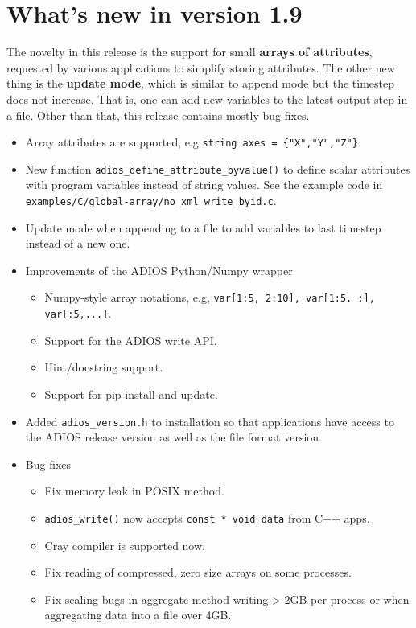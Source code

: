 \section {What's new in version 1.9}
The novelty in this release is the support for small {\bf arrays of attributes}, requested by various applications to simplify storing attributes. The other new thing is the {\bf update mode}, which is similar to append mode but the timestep does not increase. That is, one can add new variables to the latest output step in a file. Other than that, this release contains mostly bug fixes. 

\begin{itemize}
\item Array attributes are supported, e.g \verb+string axes = {"X","Y","Z"}+
\item New function \verb+adios_define_attribute_byvalue()+ 
         to define scalar attributes with program variables instead of string values. See the example code in
         \verb+examples/C/global-array/no_xml_write_byid.c+.
\item Update mode when appending to a file to add variables to last timestep instead of a new one.

\item Improvements of the ADIOS Python/Numpy wrapper
    \begin{itemize}
    \item Numpy-style array notations, e.g, \verb+var[1:5, 2:10], var[1:5. :], var[:5,...]+.
    \item Support for the ADIOS write API.
    \item Hint/docstring support.
    \item Support for pip install and update.
    \end{itemize}

\item Added \verb+adios_version.h+ to installation so that applications have access to the ADIOS release version as well as the file format version.

\item Bug fixes
    \begin{itemize}
    \item Fix memory leak in POSIX method.
    \item \verb+adios_write()+ now accepts \verb+const * void data+ from C++ apps.
    \item Cray compiler is supported now.
    \item Fix reading of compressed, zero size arrays on some processes.
    \item Fix scaling bugs in aggregate method writing > 2GB per process or when
           aggregating data into a file over 4GB.
    \end{itemize}
\end{itemize}


